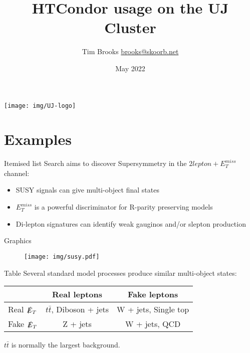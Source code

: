 \documentclass[9pt]{beamer}
\title[HTCondor @UJ\hspace{2em}\insertframenumber/
\inserttotalframenumber]{HTCondor usage on the UJ Cluster}
\author[Tim Brooks]{
    \texorpdfstring{
    Tim Brooks
    \small{\href{mailto:brooks@skoorb.net}{\textlangle{}brooks@skoorb.net\textrangle{}}}
    }{Tim Brooks}
}
\institute{University of Johannesburg}
\date{May 2022}
\begin{document}
\begin{frame}
\titlepage
\centering
\texttt{[image: img/UJ-logo]}
\end{frame}

\section{Examples}
\begin{frame}{Itemised list}
Search aims to discover Supersymmetry in the $2 lepton + E_{T}^{miss}$ channel:
  \begin{itemize}
    \item SUSY signals can give multi-object final states
    \item $E_{T}^{miss}$ is a powerful discriminator for R-parity preserving models
    \item Di-lepton signatures can identify weak gauginos and/or slepton production
  \end{itemize}
\end{frame}

\begin{frame}{Graphics}
  \begin{figure}
    \centering
    \texttt{[image: img/susy.pdf]}
  \end{figure}
\end{frame}

\begin{frame}{Table}
Several standard model processes produce similar multi-object states:

\begin{table}
\centering
\begin{tabular}{l||c|c}
                     & Real leptons               & Fake leptons         \\
\hline \hline
Real $\slashed{E}_{T}$ & $t\bar{t}$, Diboson + jets & W + jets, Single top \\
\hline
Fake $\slashed{E}_{T}$ & Z + jets                   & W + jets, QCD        \\
\end{tabular}
\label{tab:myfirsttable}
\end{table}

$t\bar{t}$ is normally the largest background.
\end{frame}
\end{document}
